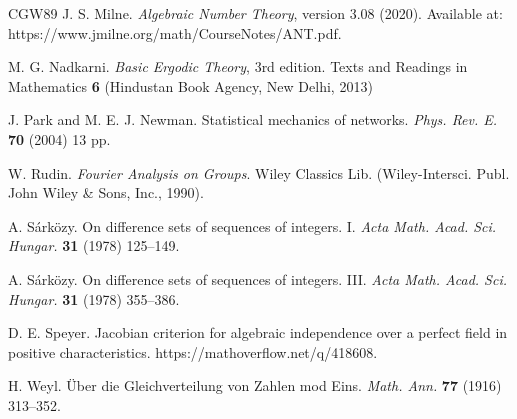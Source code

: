 \documentclass{amsart}
\theoremstyle{definition}
\numberwithin{equation}{section}
\begin{document}
\begin{thebibliography}{CGW89}
J. S. Milne.
\newblock   \emph{Algebraic Number Theory}, version 3.08 (2020).
\newblock   Available at: https://www.jmilne.org/math/CourseNotes/ANT.pdf.

M. G. Nadkarni.
\newblock   \emph{Basic Ergodic Theory}, 3rd edition.
\newblock   Texts and Readings in Mathematics \textbf{6} (Hindustan Book Agency, New Delhi, 2013)

J. Park and M. E. J. Newman.
\newblock   Statistical mechanics of networks.
\newblock   \emph{Phys. Rev. E.} \textbf{70} (2004) 13 pp.

W. Rudin.
\newblock   \emph{Fourier Analysis on Groups}.
\newblock Wiley Classics Lib. (Wiley-Intersci. Publ. John Wiley \& Sons, Inc., 1990).

A. S\'{a}rk\"{o}zy.
\newblock	On difference sets of sequences of integers. {I}.
\newblock	\emph{Acta Math. Acad. Sci. Hungar.} \textbf{31} (1978) 125--149.

A. S\'{a}rk\"{o}zy.
\newblock	On difference sets of sequences of integers. {III}.
\newblock	\emph{Acta Math. Acad. Sci. Hungar.} \textbf{31} (1978) 355--386.

D. E. Speyer.
\newblock   Jacobian criterion for algebraic independence over a perfect field in positive characteristics.
\newblock   https://mathoverflow.net/q/418608.

H. Weyl.
\newblock   \"{U}ber die Gleichverteilung von Zahlen mod Eins.
\newblock   \emph{Math. Ann.} \textbf{77} (1916) 313--352.

\end{thebibliography}
\end{document}
